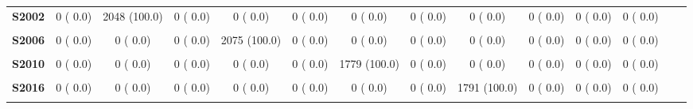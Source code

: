 \documentclass[
]{article}
\begin{document}
\begin{table}[H]
\begin{tabular}[t]{>{\raggedright\arraybackslash}p{5em}ccccccccccccc}
\textbf{S2002} & 0 (  0.0) & 2048 (100.0) & 0 (  0.0) & 0 (  0.0) & 0 (  0.0) & 0 (  0.0) & 0 (  0.0) & 0 (  0.0) & 0 (  0.0) & 0 (  0.0) & 0 (  0.0) &  & \\
\textbf{\cellcolor{gray!10}{S2004}} & \cellcolor{gray!10}{0 (  0.0)} & \cellcolor{gray!10}{0 (  0.0)} & \cellcolor{gray!10}{2094 (100.0)} & \cellcolor{gray!10}{0 (  0.0)} & \cellcolor{gray!10}{0 (  0.0)} & \cellcolor{gray!10}{0 (  0.0)} & \cellcolor{gray!10}{0 (  0.0)} & \cellcolor{gray!10}{0 (  0.0)} & \cellcolor{gray!10}{0 (  0.0)} & \cellcolor{gray!10}{0 (  0.0)} & \cellcolor{gray!10}{0 (  0.0)} & \cellcolor{gray!10}{} & \cellcolor{gray!10}{}\\
\textbf{S2006} & 0 (  0.0) & 0 (  0.0) & 0 (  0.0) & 2075 (100.0) & 0 (  0.0) & 0 (  0.0) & 0 (  0.0) & 0 (  0.0) & 0 (  0.0) & 0 (  0.0) & 0 (  0.0) &  & \\
\textbf{\cellcolor{gray!10}{S2008}} & \cellcolor{gray!10}{0 (  0.0)} & \cellcolor{gray!10}{0 (  0.0)} & \cellcolor{gray!10}{0 (  0.0)} & \cellcolor{gray!10}{0 (  0.0)} & \cellcolor{gray!10}{1746 (100.0)} & \cellcolor{gray!10}{0 (  0.0)} & \cellcolor{gray!10}{0 (  0.0)} & \cellcolor{gray!10}{0 (  0.0)} & \cellcolor{gray!10}{0 (  0.0)} & \cellcolor{gray!10}{0 (  0.0)} & \cellcolor{gray!10}{0 (  0.0)} & \cellcolor{gray!10}{} & \cellcolor{gray!10}{}\\
\textbf{S2010} & 0 (  0.0) & 0 (  0.0) & 0 (  0.0) & 0 (  0.0) & 0 (  0.0) & 1779 (100.0) & 0 (  0.0) & 0 (  0.0) & 0 (  0.0) & 0 (  0.0) & 0 (  0.0) &  & \\
\textbf{\cellcolor{gray!10}{S2013}} & \cellcolor{gray!10}{0 (  0.0)} & \cellcolor{gray!10}{0 (  0.0)} & \cellcolor{gray!10}{0 (  0.0)} & \cellcolor{gray!10}{0 (  0.0)} & \cellcolor{gray!10}{0 (  0.0)} & \cellcolor{gray!10}{0 (  0.0)} & \cellcolor{gray!10}{1885 (100.0)} & \cellcolor{gray!10}{0 (  0.0)} & \cellcolor{gray!10}{0 (  0.0)} & \cellcolor{gray!10}{0 (  0.0)} & \cellcolor{gray!10}{0 (  0.0)} & \cellcolor{gray!10}{} & \cellcolor{gray!10}{}\\
\textbf{S2016} & 0 (  0.0) & 0 (  0.0) & 0 (  0.0) & 0 (  0.0) & 0 (  0.0) & 0 (  0.0) & 0 (  0.0) & 1791 (100.0) & 0 (  0.0) & 0 (  0.0) & 0 (  0.0) &  & \\
\textbf{\cellcolor{gray!10}{S2018}} & \cellcolor{gray!10}{0 (  0.0)} & \cellcolor{gray!10}{0 (  0.0)} & \cellcolor{gray!10}{0 (  0.0)} & \cellcolor{gray!10}{0 (  0.0)} & \cellcolor{gray!10}{0 (  0.0)} & \cellcolor{gray!10}{0 (  0.0)} & \cellcolor{gray!10}{0 (  0.0)} & \cellcolor{gray!10}{0 (  0.0)} & \cellcolor{gray!10}{1778 (100.0)} & \cellcolor{gray!10}{0 (  0.0)} & \cellcolor{gray!10}{0 (  0.0)} & \cellcolor{gray!10}{} & \cellcolor{gray!10}{}\\

\end{tabular}
\end{table}
\end{document}
